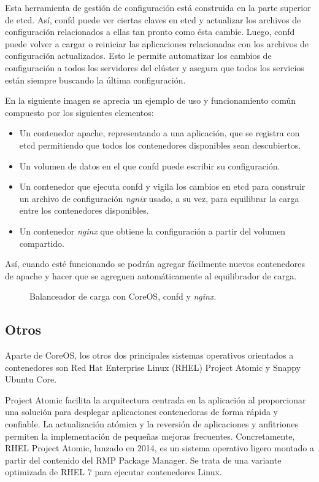 Esta herramienta de gestión de configuración está construida en la parte superior de etcd. Así, confd puede ver ciertas claves en etcd y actualizar los archivos de configuración relacionados a ellas tan pronto como ésta cambie. Luego, confd puede volver a cargar o reiniciar las aplicaciones relacionadas con los archivos de configuración actualizados. Esto le permite automatizar los cambios de configuración a todos los servidores del clúster y asegura que todos los servicios están siempre buscando la última configuración.

En la siguiente imagen se aprecia un ejemplo de uso y funcionamiento común compuesto por los siguientes elementos: 
\begin{itemize}
\item Un contenedor apache, representando a una aplicación, que se registra con etcd permitiendo que todos los contenedores disponibles sean descubiertos. 
\item Un volumen de datos en el que confd puede escribir su configuración.
\item Un contenedor que ejecuta confd y vigila los cambios en etcd para construir un archivo de configuración \textit{ngnix} usado, a su vez, para equilibrar la carga entre los contenedores disponibles.
\item Un contenedor \textit{nginx} que obtiene la configuración a partir del volumen compartido.
\end{itemize}

Así, cuando esté funcionando se podrán agregar fácilmente nuevos contenedores de apache y hacer que se agreguen automáticamente al equilibrador de carga.

\begin{figure}[H]
\caption{Balanceador de carga con CoreOS, confd y \textit{nginx}.\label{fig:figure_placement_example}}
\end{figure}

\subsection{Otros}

Aparte de CoreOS, los otros dos principales sistemas operativos orientados a contenedores son  Red Hat Enterprise Linux (RHEL) Project Atomic y Snappy Ubuntu Core.

Project Atomic facilita la arquitectura centrada en la aplicación al proporcionar una solución para desplegar aplicaciones contenedoras de forma rápida y confiable. La actualización atómica y la reversión de aplicaciones y anfitriones permiten la implementación de pequeñas mejoras frecuentes. Concretamente, RHEL Project Atomic, lanzado en 2014, es un sistema operativo ligero montado a partir del contenido del RMP Package Manager. Se trata de una variante optimizada de RHEL 7 para ejecutar contenedores Linux.

